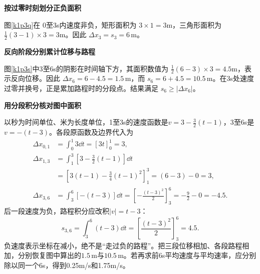 \begin{solution}\textbf{按过零时刻划分正负面积}\par\nobreak
图\ref{k1p3q}在 $0$至3s内速度非负，矩形面积为 $3\times1=3$m，三角形面积为 $\tfrac12(3-1)\times3=3$m。因此 $\Delta x_3=s_3=\boxed{6\,\mathrm m}$。


\par\medskip{}\noindent\textbf{反向阶段分别累计位移与路程}\par\nobreak
图\ref{k1p3s}中3至6s的阴影在时间轴下方，其面积数值为 $\tfrac12(6-3)\times3=4.5$m，表示反向位移。因此 $\boxed{\Delta x_6=6-4.5=1.5\,\mathrm m}$，而 $\boxed{s_6=6+4.5=10.5\,\mathrm m}$。在3s处速度过零并换号，正是累加路程时的分段点。结果满足 $s_6\ge|\Delta x_6|$。

\par\medskip{}\noindent\textbf{用分段积分核对图中面积}\par\nobreak
以秒为时间单位、米为长度单位，1至3s的速度函数是$v=3-\tfrac32(t-1)$，3至6s是$v=-(t-3)$。各段原函数及边界代入为
\begin{align*}
\Delta x_{0,1}&=\int_0^1 3\dd t=[3t]_0^1=3,\\
\Delta x_{1,3}&=\int_1^3\left[3-\frac32(t-1)\right]\dd t\\
&=\left[3(t-1)-\frac34(t-1)^2\right]_1^3
=(6-3)-0=3,\\
\Delta x_{3,6}&=\int_3^6[-(t-3)]\dd t
=\left[-\frac{(t-3)^2}{2}\right]_3^6
=-\frac92-0=-4.5.
\end{align*}
后一段速度为负，路程积分应改积$|v|=t-3$：
\[
s_{3,6}=\int_3^6(t-3)\dd t
=\left[\frac{(t-3)^2}{2}\right]_3^6=4.5.
\]
负速度表示坐标在减小，绝不是“走过负的路程”。把三段位移相加、各段路程相加，分别恢复图中算出的$1.5\,\mathrm m$与$10.5\,\mathrm m$。若再求前6s平均速度与平均速率，应分别除以同一个6s，得到0.25m/s和1.75m/s。\end{solution}

